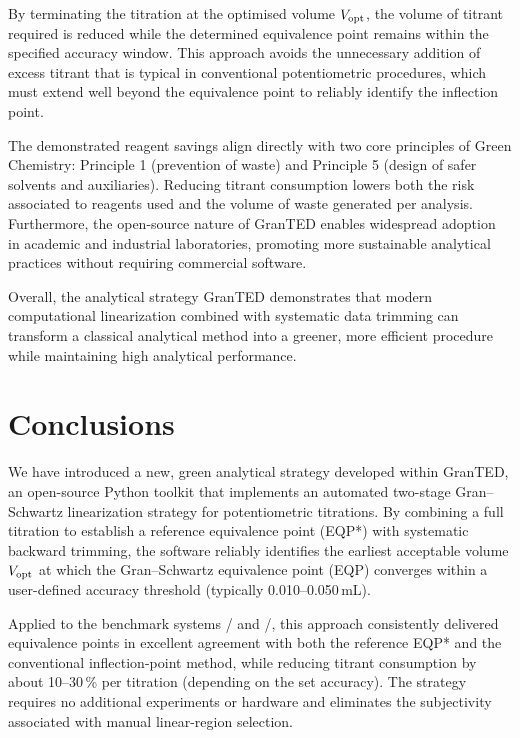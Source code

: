 \documentclass[twoside,twocolumn,9pt]{article}
\begin{document}
By terminating the titration at the optimised volume \(V_{\rm opt}\), the volume of titrant required is reduced while the determined equivalence point remains within the specified accuracy window.
This approach avoids the unnecessary addition of excess titrant that is typical in conventional potentiometric procedures, which must extend well beyond the equivalence point to reliably identify the inflection point.

The demonstrated reagent savings align directly with two core principles of Green Chemistry: Principle 1 (prevention of waste) and Principle 5 (design of safer solvents and auxiliaries).
Reducing titrant consumption lowers both the risk associated to reagents used and the volume of waste generated per analysis.
Furthermore, the open-source nature of \textsf{GranTED} enables widespread adoption in academic and industrial laboratories, promoting more sustainable analytical practices without requiring commercial software.

Overall, the analytical strategy \textsf{GranTED} demonstrates that modern computational linearization combined with systematic data trimming can transform a classical analytical method into a greener, more efficient procedure while maintaining high analytical performance.

\section*{Conclusions}

We have introduced a new, green analytical strategy developed within \textsf{GranTED}, an open-source Python toolkit that implements an automated two-stage Gran--Schwartz linearization strategy for potentiometric titrations. By combining a full titration to establish a reference equivalence point (EQP*) with systematic backward trimming, the software reliably identifies the earliest acceptable volume \(V_{\rm opt}\) at which the Gran--Schwartz equivalence point (EQP) converges within a user-defined accuracy threshold (typically 0.010--0.050\,mL). 

Applied to the benchmark systems / and /, this approach consistently delivered equivalence points in excellent agreement with both the reference EQP* and the conventional inflection-point method, while reducing titrant consumption by about 10--30\,\% per titration (depending on the set accuracy). The strategy requires no additional experiments or hardware and eliminates the subjectivity associated with manual linear-region selection.
\end{document}
